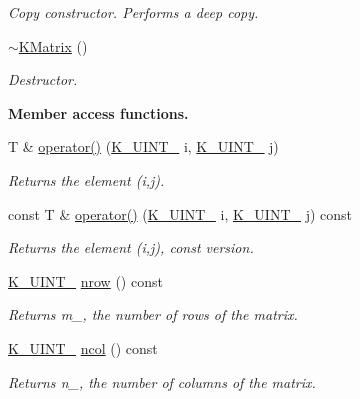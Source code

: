 \begin{Indent}
\begin{DoxyCompactItemize}
\begin{DoxyCompactList}\small\item\em Copy constructor. Performs a deep copy. \end{DoxyCompactList}\item 
\mbox{\label{classKalman_1_1KMatrix_a225bc818771bf361b398bde2f796e4dc}} 
\mbox{\hyperlink{classKalman_1_1KMatrix_a225bc818771bf361b398bde2f796e4dc}{$\sim$\+K\+Matrix}} ()
\begin{DoxyCompactList}\small\item\em Destructor. \end{DoxyCompactList}\end{DoxyCompactItemize}
\end{Indent}
\begin{Indent}\textbf{ Member access functions.}\par
\begin{DoxyCompactItemize}
\item 
T \& \mbox{\hyperlink{classKalman_1_1KMatrix_a2174d21ab2ffb5c11b28d05ebb7ecb16}{operator()}} (\mbox{\hyperlink{namespaceKalman_a628a50cae10f6e2035393d4f96c698bd}{K\+\_\+\+U\+I\+N\+T\+\_}} i, \mbox{\hyperlink{namespaceKalman_a628a50cae10f6e2035393d4f96c698bd}{K\+\_\+\+U\+I\+N\+T\+\_}} j)
\begin{DoxyCompactList}\small\item\em Returns the element {\ttfamily (i,j)}. \end{DoxyCompactList}\item 
const T \& \mbox{\hyperlink{classKalman_1_1KMatrix_a79550cd241ef83c904b12f1feda0452e}{operator()}} (\mbox{\hyperlink{namespaceKalman_a628a50cae10f6e2035393d4f96c698bd}{K\+\_\+\+U\+I\+N\+T\+\_}} i, \mbox{\hyperlink{namespaceKalman_a628a50cae10f6e2035393d4f96c698bd}{K\+\_\+\+U\+I\+N\+T\+\_}} j) const
\begin{DoxyCompactList}\small\item\em Returns the element {\ttfamily (i,j)}, {\ttfamily const} version. \end{DoxyCompactList}\item 
\mbox{\hyperlink{namespaceKalman_a628a50cae10f6e2035393d4f96c698bd}{K\+\_\+\+U\+I\+N\+T\+\_}} \mbox{\hyperlink{classKalman_1_1KMatrix_a2edc23298da61cfcc3e391826b1c941b}{nrow}} () const
\begin{DoxyCompactList}\small\item\em Returns {\itshape m\+\_\+}, the number of rows of the matrix. \end{DoxyCompactList}\item 
\mbox{\hyperlink{namespaceKalman_a628a50cae10f6e2035393d4f96c698bd}{K\+\_\+\+U\+I\+N\+T\+\_}} \mbox{\hyperlink{classKalman_1_1KMatrix_a6e9f54a8bd0fb8fc90430630d5a648dd}{ncol}} () const
\begin{DoxyCompactList}\small\item\em Returns {\itshape n\+\_\+}, the number of columns of the matrix. \end{DoxyCompactList}\end{DoxyCompactItemize}
\end{Indent}
